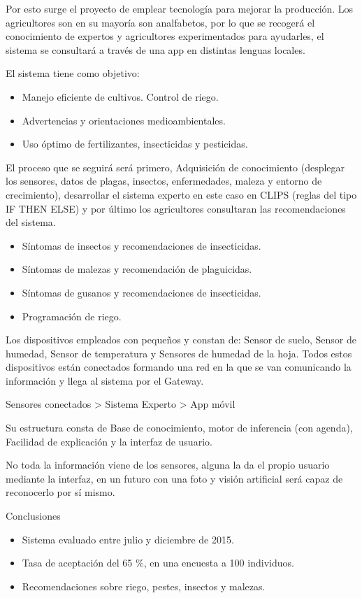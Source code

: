 \documentclass[12pt, twoside, openright]{report} %
\begin{document}
Por esto surge el proyecto de emplear tecnología para mejorar la producción. Los agricultores son en su mayoría son analfabetos, por lo que se recogerá el conocimiento de expertos y agricultores experimentados para ayudarles, el sistema se consultará a través de una app en distintas lenguas locales.

El sistema tiene como objetivo:
\begin{itemize}
	\item Manejo eficiente de cultivos. Control de riego.
	\item Advertencias y orientaciones medioambientales.
	\item Uso óptimo de fertilizantes, insecticidas y pesticidas.
\end{itemize}

El proceso que se seguirá será primero, Adquisición de conocimiento (desplegar los sensores, datos de plagas, insectos, enfermedades, maleza y entorno de crecimiento), desarrollar el sistema experto en este caso en CLIPS (reglas del tipo IF THEN ELSE) y por último los agricultores consultaran las recomendaciones del sistema.
\begin{itemize}
	\item Síntomas de insectos y recomendaciones de insecticidas.
	\item Síntomas de malezas y recomendación de plaguicidas.
	\item Síntomas de gusanos y recomendaciones de insecticidas.
	\item Programación de riego.
\end{itemize}

Los dispositivos empleados con pequeños y constan de: Sensor de suelo, Sensor de humedad, Sensor de temperatura y Sensores de humedad de la hoja. Todos estos dispositivos están conectados formando una red en la que se van comunicando la información y llega al sistema por el Gateway.

Sensores conectados > Sistema Experto > App móvil

Su estructura consta de Base de conocimiento, motor de inferencia (con agenda), Facilidad de explicación y la interfaz de usuario.

No toda la información viene de los sensores, alguna la da el propio usuario mediante la interfaz, en un futuro con una foto y visión artificial será capaz de reconocerlo por sí mismo.
\pagebreak

Conclusiones
\begin{itemize}
	\item Sistema evaluado entre julio y diciembre de 2015.
	\item Tasa de aceptación del 65 \%, en una encuesta a 100 individuos.
	\item Recomendaciones sobre riego, pestes, insectos y malezas.
\end{itemize}
\end{document}
